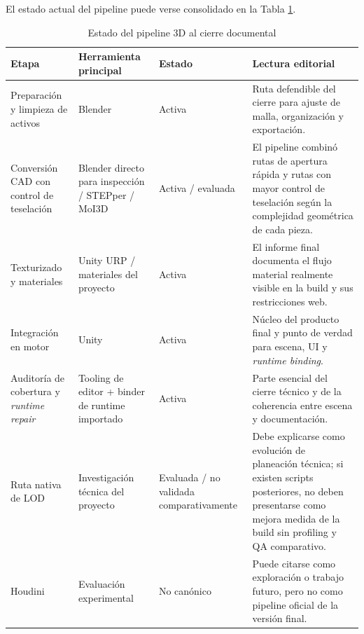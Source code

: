 El estado actual del pipeline puede verse consolidado en la Tabla \ref{tab:pipeline_3d_cierre}.

\begin{table}[H]
    \caption{Estado del pipeline 3D al cierre documental}
    \label{tab:pipeline_3d_cierre}
    \centering
    \scriptsize\singlespacing
    \begin{tabular}{p{3.1cm}p{3.1cm}p{2.8cm}p{4.6cm}}
        \hline
        \textbf{Etapa} & \textbf{Herramienta principal} & \textbf{Estado} & \textbf{Lectura editorial} \\ \hline
        Preparación y limpieza de activos & Blender & Activa & Ruta defendible del cierre para ajuste de malla, organización y exportación. \\
        Conversión CAD con control de teselación & Blender directo para inspección / STEPper / MoI3D & Activa / evaluada & El pipeline combinó rutas de apertura rápida y rutas con mayor control de teselación según la complejidad geométrica de cada pieza. \\
        Texturizado y materiales & Unity URP / materiales del proyecto & Activa & El informe final documenta el flujo material realmente visible en la build y sus restricciones web. \\
        Integración en motor & Unity & Activa & Núcleo del producto final y punto de verdad para escena, UI y \textit{runtime binding}. \\
        Auditoría de cobertura y \textit{runtime repair} & Tooling de editor + binder de runtime importado & Activa & Parte esencial del cierre técnico y de la coherencia entre escena y documentación. \\
        Ruta nativa de LOD & Investigación técnica del proyecto & Evaluada / no validada comparativamente & Debe explicarse como evolución de planeación técnica; si existen scripts posteriores, no deben presentarse como mejora medida de la build sin profiling y QA comparativo. \\
        Houdini & Evaluación experimental & No canónico & Puede citarse como exploración o trabajo futuro, pero no como pipeline oficial de la versión final. \\ \hline
    \end{tabular}
    \par\vspace{0.5\baselineskip}
\end{table}

